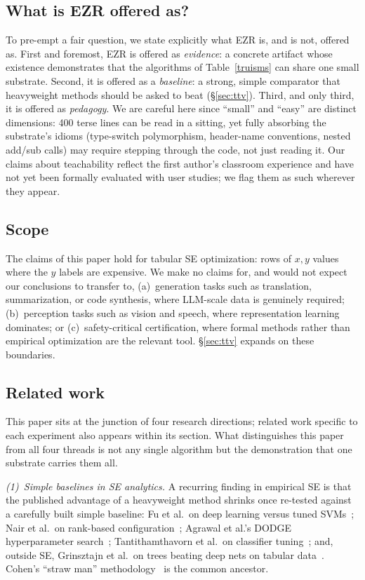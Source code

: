 \documentclass[AMA,STIX2COL]{WileyNJDv5}
\newcommand{\IT}{{\sffamily EZR}}
\begin{document}
\subsection{What is EZR offered as?}\label{sec:offered}
To pre-empt a fair question, we state explicitly what \IT{} is,
and is not, offered as. First and foremost, \IT{} is offered as
{\em evidence}: a concrete artifact whose existence demonstrates
that the algorithms of Table~\ref{truisms} can share one small
substrate. Second, it is offered as a {\em baseline}: a strong,
simple comparator that heavyweight methods should be asked to
beat (\S\ref{sec:ttv}). Third, and only third, it is offered as
{\em pedagogy}. We are careful here since ``small'' and ``easy''
are distinct dimensions: 400 terse lines can be read in a
sitting, yet fully absorbing the substrate's idioms (type-switch
polymorphism, header-name conventions, nested add/sub calls) may
require stepping through the code, not just reading it. Our
claims about teachability reflect the first author's classroom
experience and have not yet been formally evaluated with user
studies; we flag them as such wherever they appear.

\subsection{Scope}\label{sec:scope}
The claims of this paper hold for tabular SE optimization: rows
of $x,y$ values where the $y$ labels are expensive. We make no
claims for, and would not expect our conclusions to transfer to,
(a)~generation tasks such as translation, summarization, or code
synthesis, where LLM-scale data is genuinely required;
(b)~perception tasks such as vision and speech, where
representation learning dominates; or (c)~safety-critical
certification, where formal methods rather than empirical
optimization are the relevant tool. \S\ref{sec:ttv} expands on
these boundaries.

\subsection{Related work}\label{sec:related}
This paper sits at the junction of four research directions; related work
specific to each experiment also appears within its section. What distinguishes this paper from all four
threads is not any single algorithm but the demonstration that
one substrate carries them all. 

{\em (1)~Simple baselines in SE analytics.} A recurring finding
in empirical SE is that the published advantage of a heavyweight
method shrinks once re-tested against a carefully built simple
baseline: Fu et al.\ on deep learning versus tuned
SVMs~\cite{fu2016tuning,Fu17}; Nair et al.\ on rank-based
configuration~\cite{Nair17a}; Agrawal et al.'s DODGE
hyperparameter search~\cite{agrawal2019dodge}; Tantithamthavorn
et al.\ on classifier tuning~\cite{tantithamthavorn2016automated};
and, outside SE, Grinsztajn et al.\ on trees beating deep nets on
tabular data~\cite{grinsztajn2022why}. Cohen's ``straw man''
methodology~\cite{cohen1995empirical} is the common ancestor.
\end{document}
